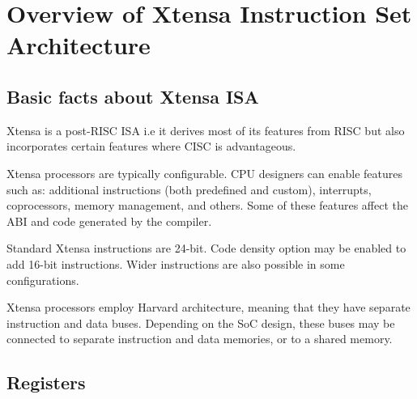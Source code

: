 \chapter{Overview of Xtensa Instruction Set Architecture}

\section{Basic facts about Xtensa ISA}


Xtensa is a post-RISC ISA i.e it derives most of its features from RISC but also incorporates certain features where CISC is advantageous.

Xtensa processors are typically configurable. CPU designers can enable features such as: additional instructions (both predefined and custom), interrupts, coprocessors, memory management, and others. Some of these features affect the ABI and code generated by the compiler.

Standard Xtensa instructions are 24-bit. Code density option may be enabled to add 16-bit instructions. Wider instructions are also possible in some configurations.

Xtensa processors employ Harvard architecture, meaning that they have separate instruction and data buses. Depending on the SoC design, these buses may be connected to separate instruction and data memories, or to a shared memory.

\section{Registers}

